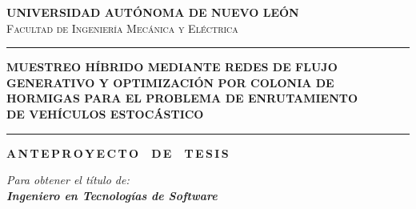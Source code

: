 \documentclass[12pt]{report}
\begin{document}
\begin{titlepage}
\pagecolor{white}


\vspace*{0.5cm}

\begin{center}

{\fontsize{15.5}{19}\selectfont\bfseries\textcolor{uanlblue}{%
  UNIVERSIDAD AUT\'ONOMA DE NUEVO LE\'ON}}\\[0.3cm]
{\fontsize{11.5}{14}\selectfont\textsc{\textcolor{uanlblue}{%
  Facultad de Ingenier\'ia Mec\'anica y El\'ectrica}}}

\vspace{0.6cm}
{\color{uanlgold}\rule{0.55\textwidth}{1.6pt}}
\vspace{0.8cm}

{\fontsize{13.0}{18}\selectfont\bfseries\textcolor{uanlblue}{%
  MUESTREO H\'IBRIDO MEDIANTE REDES DE FLUJO\\[0.2cm]
  GENERATIVO Y OPTIMIZACI\'ON POR COLONIA DE\\[0.2cm]
  HORMIGAS PARA EL PROBLEMA DE ENRUTAMIENTO\\[0.2cm]
  DE VEH\'ICULOS ESTOC\'ASTICO}}

\vspace{0.8cm}
{\color{uanlgold}\rule{0.55\textwidth}{1.6pt}}
\vspace{1.0cm}

{\fontsize{16}{20}\selectfont\bfseries\textcolor{uanlblue}{%
  A\,N\,T\,E\,P\,R\,O\,Y\,E\,C\,T\,O\ \ D\,E\ \ T\,E\,S\,I\,S}}

\vspace{0.2cm}
{\fontsize{11}{14}\selectfont\textit{Para obtener el t\'itulo de:}}\\[0.45cm]
{\fontsize{13.5}{17}\selectfont\bfseries\textit{%
  Ingeniero en Tecnolog\'ias de Software}}

\vspace{0.5cm}


\end{center}
\end{titlepage}
\end{document}
